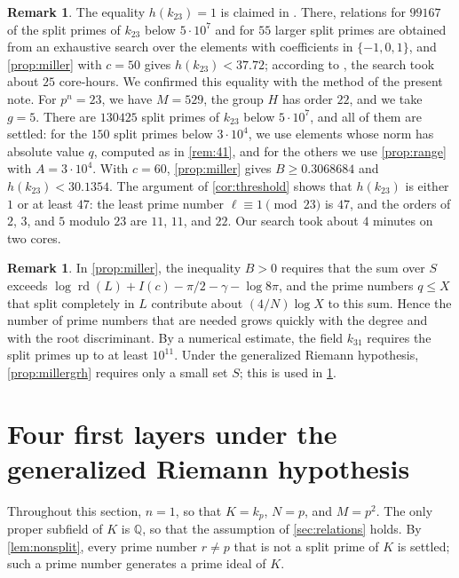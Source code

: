 \documentclass[11pt]{amsart}
\theoremstyle{plain}
\theoremstyle{definition}
\newtheorem{remark}[theorem]{Remark}
\begin{document}
\begin{remark} \label{rem:23}
The equality $h(k_{23}) = 1$ is claimed in \cite{Ch26}.
There, relations for $99167$ of the split primes of $k_{23}$ below $5 \cdot 10^7$ and for $55$ larger split primes are obtained from an exhaustive search over the elements with coefficients in $\{-1, 0, 1\}$, and \cref{prop:miller} with $c = 50$ gives $h(k_{23}) < 37.72$; according to \cite{Ch26}, the search took about $25$ core-hours.
We confirmed this equality with the method of the present note.
For $p^n = 23$, we have $M = 529$, the group $H$ has order $22$, and we take $g = 5$.
There are $130425$ split primes of $k_{23}$ below $5 \cdot 10^7$, and all of them are settled: for the $150$ split primes below $3 \cdot 10^4$, we use elements whose norm has absolute value $q$, computed as in \cref{rem:41}, and for the others we use \cref{prop:range} with $A = 3 \cdot 10^4$.
With $c = 60$, \cref{prop:miller} gives $B \ge 0.3068684$ and $h(k_{23}) < 30.1354$.
The argument of \cref{cor:threshold} shows that $h(k_{23})$ is either $1$ or at least $47$: the least prime number $\ell \equiv 1 \pmod{23}$ is $47$, and the orders of $2$, $3$, and $5$ modulo $23$ are $11$, $11$, and $22$.
Our search took about $4$ minutes on two cores.
\end{remark}

\begin{remark} \label{rem:limit}
In \cref{prop:miller}, the inequality $B > 0$ requires that the sum over $S$ exceeds $\log \operatorname{rd}(L) + I(c) - \pi/2 - \gamma - \log 8\pi$, and the prime numbers $q \le X$ that split completely in $L$ contribute about $(4/N) \log X$ to this sum.
Hence the number of prime numbers that are needed grows quickly with the degree and with the root discriminant.
By a numerical estimate, the field $k_{31}$ requires the split primes up to at least $10^{11}$.
Under the generalized Riemann hypothesis, \cref{prop:millergrh} requires only a small set $S$; this is used in \cref{sec:grh}.
\end{remark}

\section{Four first layers under the generalized Riemann hypothesis} \label{sec:grh}

Throughout this section, $n = 1$, so that $K = k_p$, $N = p$, and $M = p^2$.
The only proper subfield of $K$ is $\mathbb{Q}$, so that the assumption of \cref{sec:relations} holds.
By \cref{lem:nonsplit}, every prime number $r \ne p$ that is not a split prime of $K$ is settled; such a prime number generates a prime ideal of $K$.
\end{document}
